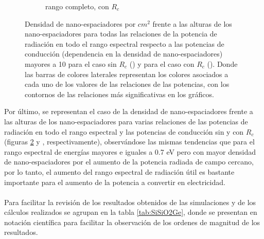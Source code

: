 \begin{figure}[H]
\begin{subfigure}[b]{0.49\textwidth}
			\caption{rango completo, con $R_c$}
			\label{fig:rel_SiSiO2Ge_Rc_full}
		\end{subfigure}
	\caption{Densidad de nano-espaciadores por $cm^2$ frente a las alturas de los nano-espaciadores para todas las relaciones de la potencia de radiación en todo el rango espectral respecto a las potencias de conducción (dependencia en la densidad de nano-espaciadores) mayores a 10 para el caso sin $R_c$ () y para el caso con $R_c$ (). Donde las barras de colores laterales representan los colores asociados a cada uno de los valores de las relaciones de las potencias, con los contornos de las relaciones más significativas en los gráficos.}%
	\label{fig:rels_SiSiO2Ge_full}%
\end{figure}
Por último, se representan el caso de la densidad de nano-espaciadores frente a las alturas de los nano-espaciadores para varias relaciones de las potencias de radiación en todo el rango espectral y las potencias de conducción sin y con $R_c$ (figuras \ref{fig:rels_SiSiO2Ge_full}   y , respectivamente), observándose las mismas tendencias que para el rango espectral de energías mayores e iguales a 0.7 eV pero con mayor densidad de nano-espaciadores por el aumento de la potencia radiada de campo cercano, por lo tanto, el aumento del rango espectral de radiación útil es bastante importante para el aumento de la potencia a convertir en electricidad.\\\\
Para facilitar la revisión de los resultados obtenidos de las simulaciones y de los cálculos realizados se agrupan en la tabla \ref{tab:SiSiO2Ge}, donde se presentan en notación científica para facilitar la observación de los ordenes de magnitud de los resultados.
